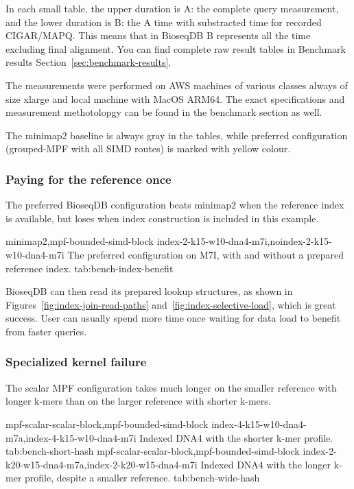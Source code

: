 In each small table, the upper duration is A: the complete query measurement,
and the lower duration is B: the A time with substracted time for recorded CIGAR/MAPQ.
This means that in BioseqDB B represents all the time excluding final alignment.
You can find complete raw result tables in Benchmark results Section~\ref{sec:benchmark-results}.

The measurements were performed on AWS machines of various classes always of size xlarge and local machine with MacOS ARM64.
The exact specifications and measurement methotolopgy can be found in the benchmark section as well.

The minimap2 baseline is always gray in the tables, while preferred configuration (grouped-MPF with all SIMD routes) is marked with yellow colour.

\subsubsection{Paying for the reference once}
\label{sec:bench-index-benefit}

The preferred BioseqDB configuration beats minimap2 when the reference index
is available, but loses when index construction is included in this example.

  {minimap2,mpf-bounded-simd-block}
  {index-2-k15-w10-dna4-m7i,noindex-2-k15-w10-dna4-m7i}
  {The preferred configuration on M7I, with and without a prepared reference index.}
  {tab:bench-index-benefit}

BioseqDB can then read its prepared lookup structures, as shown in
Figures~\ref{fig:index-join-read-paths} and~\ref{fig:index-selective-load}, which is great success. User can usually spend more time once waiting for data load to benefit from faster queries.

\subsubsection{Specialized kernel failure}
\label{sec:bench-wide-hash}

The scalar MPF configuration takes much longer on the smaller reference with
longer k-mers than on the larger reference with shorter k-mers.

  {mpf-scalar-scalar-block,mpf-bounded-simd-block}
  {index-4-k15-w10-dna4-m7a,index-4-k15-w10-dna4-m7i}
  {Indexed DNA4 with the shorter k-mer profile.}
  {tab:bench-short-hash}
  {mpf-scalar-scalar-block,mpf-bounded-simd-block}
  {index-2-k20-w15-dna4-m7a,index-2-k20-w15-dna4-m7i}
  {Indexed DNA4 with the longer k-mer profile, despite a smaller reference.}
  {tab:bench-wide-hash}



